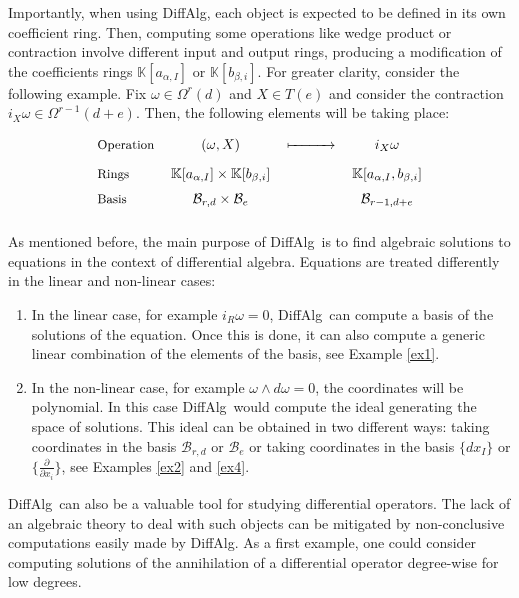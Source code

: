 \documentclass{amsart}
\theoremstyle{definition}
\def\KK{\mathbb{K}}
\def\dA{{\ttfamily DiffAlg}}
\begin{document}
\bigskip


Importantly, when using \dA, each object is expected to be defined in its own coefficient ring. Then, computing some operations like wedge product or contraction
involve different input and output rings, producing a modification of the coefficients rings $\KK[a_{\alpha,I}]$ or $\KK[b_{\beta,i}]$. For greater clarity, consider the following example. Fix $\omega\in\Omega^r(d)$ and $X\in T(e)$ and consider the contraction $i_X\omega\in\Omega^{r-1}(d+e)$.
Then, the following elements will be taking place:

\[
\begin{tabular}{ l  c  c c c }
  \small{Operation} & $(\omega,X)$ & $\xmapsto{\hspace{1cm}}$& $i_X\omega$\\[.9em]
  \small{Rings} & $\KK[a_{\alpha,I}]\times\KK[b_{\beta,i}]$ & & $\KK[a_{\alpha,I},b_{\beta,i}]$\\[.6em]
  \small{Basis} & $\mathcal{B}_{r,d}\times\mathcal{B}_{e}$ & &  $\mathcal{B}_{r-1,d+e}$ \\[.6em]
\end{tabular}
\]

\bigskip

As mentioned before, the main purpose of \dA\ is to find algebraic solutions to equations in the context of differential algebra. Equations are treated differently in the linear and non-linear cases:
\begin{enumerate}
\item[i)] In the linear case, for example $i_R\omega=0$, \dA\ can compute a basis of the solutions of the equation. Once this is done, it can also compute a generic linear combination of the elements of the basis, see Example \ref{ex1}.
\item[ii)] In the non-linear case, for example $\omega\wedge d\omega=0$, the coordinates will be polynomial. In this case \dA\ would compute the ideal generating the space of solutions. This ideal can be obtained in two different ways: taking coordinates in the basis $\mathcal{B}_{r,d}$ or $\mathcal{B}_{e}$ or taking coordinates in the basis $\{dx_I\}$ or $\{\frac{\partial}{\partial x_i}\}$, see Examples \ref{ex2} and \ref{ex4}.
\end{enumerate}

\bigskip
\dA\ can also be a valuable tool for studying differential operators. The lack of an algebraic theory to deal with such objects can be mitigated by non-conclusive computations easily made by \dA. As a first example, one could consider computing solutions of the annihilation of a differential operator degree-wise for low degrees.
\end{document}
